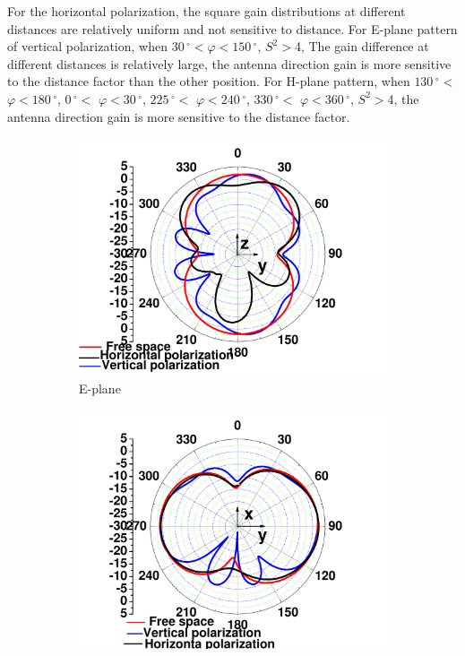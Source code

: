\documentclass[journal]{IEEEtran}
\begin{document}
For the horizontal polarization, the square gain distributions at different distances are relatively uniform and not sensitive
to distance. For E-plane pattern of vertical polarization, when $30\,^{\circ}$$<$$\varphi$$<$$150\,^{\circ}$,
$S^{2}$$>$4, The gain difference at different distances is relatively large, the antenna direction gain is more
sensitive to the distance factor than the other position. For H-plane pattern, when
$130\,^{\circ}$$<$ $\varphi$$<$$180\,^{\circ}$, $0\,^{\circ}$$<$ $\varphi$$<$$30\,^{\circ}$,
$225\,^{\circ}$$<$ $\varphi$$<$$240\,^{\circ}$, $330\,^{\circ}$$<$ $\varphi$$<$$360\,^{\circ}$,
$S^{2}$$>$4, the antenna direction gain is more sensitive to the distance factor.
\begin{figure}[!htb]
\centering
\begin{subfigure}[b]{0.24\textwidth}
\includegraphics[width=\textwidth]{figs/10a.pdf}
\caption{E-plane}
\label{fig:10a}	
\end{subfigure}		
\begin{subfigure}[b]{0.24\textwidth}
\includegraphics[width=\textwidth]{figs/10b.pdf}

\end{subfigure}
\end{figure}
\end{document}
